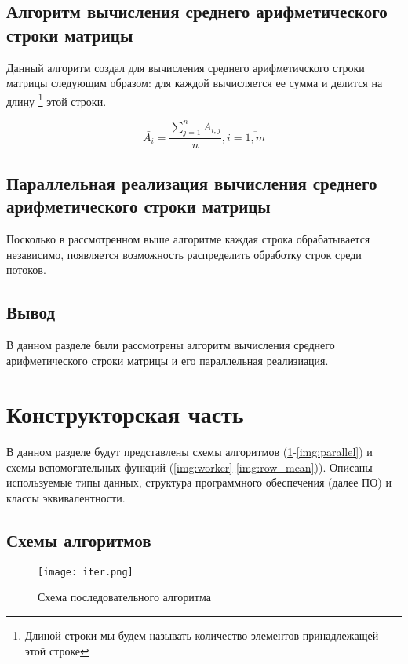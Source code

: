 \subsection{Алгоритм вычисления среднего арифметического строки матрицы}

Данный алгоритм создал для вычисления среднего арифметичского строки матрицы следующим образом: для каждой вычисляется ее сумма и делится на длину \footnote{Длиной строки мы будем называть количество элементов принадлежащей этой строке} этой строки.

\begin{equation}
    \bar{A_i} = \frac{\displaystyle\sum_{j = 1}^{n} A_{i, j}}{n}, i = \overline{1, m}
\end{equation}

\subsection{Параллельная реализация вычисления среднего арифметического строки матрицы}

Посколько в рассмотренном выше алгоритме каждая строка обрабатывается независимо, появляется возможность распределить обработку строк среди потоков.

\subsection{Вывод}

В данном разделе были рассмотрены алгоритм вычисления среднего арифметического строки матрицы и его параллельная реализиация.

\section{Конструкторская часть}

В данном разделе будут представлены схемы алгоритмов (\ref{img:iter}-\ref{img:parallel}) и схемы вспомогательных функций (\ref{img:worker}-\ref{img:row_mean})). Описаны используемые типы данных, структура программного обеспечения (далее ПО) и классы эквивалентности.

\subsection{Схемы алгоритмов}

\begin{figure}[H]
    \centering
    \texttt{[image: iter.png]}
    \caption{Схема последовательного алгоритма}
    \label{img:iter}
\end{figure}

